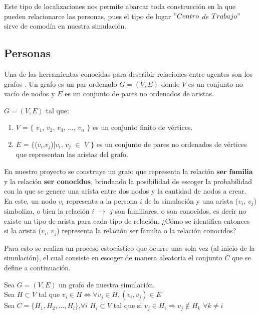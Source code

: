 Este tipo de localizaciones nos permite abarcar toda construcción en la que pueden relacionarce las personas, pues
el tipo de lugar $"Centro$ $de$ $Trabajo"$ sirve de comodín en nuestra simulación.

\subsection{Personas}
Una de las herramientas conocidas para describir relaciones entre agentes son los grafos \autocite{Newman2003}. Un grafo
es un par ordenado $G = (V,E)$ donde $V$ es un conjunto no vacío de nodos y $E$ es un conjunto de pares 
no ordenados de aristas.

\begin{center}
    $G=(V,E)$ tal que:\\
    \begin{enumerate}
        \item $V$ = $\lbrace$ $v_{1}$, $v_{2}$, $v_{3}$, ..., $v_{n}$ $\rbrace$ es un conjunto finito de vértices.
        \item $E$ = $\lbrace$($v_{i}$,$v_{j}$)|$v_{i}$, $v_{j}$ $\in$ $V$ $\rbrace$  es un conjunto de pares no ordenados de vértices que representan las aristas del grafo.
    \end{enumerate}
\end{center}

En nuestro proyecto se construye un grafo que representa la relación $\textbf{ser familia}$ y la relación \textbf{ser conocidos}, brindando
la posibilidad de escoger la probabilidad con la que se genere una arista entre dos nodos y la cantidad de nodos a crear. 
En este, un nodo $v_{i}$ representa a la persona $i$ de la simulación y una arista ($v_{i}$, $v_{j}$) simboliza,
o bien la relación $i$ $\rightarrow$ $j$ son familiares, o son conocidos, es decir no existe un tipo de arista para cada
tipo de relación. ¿Cómo se identifica entonces si la arista ($v_{i}$, $v_{j}$) representa la relación 
ser familia o la relación conocidos?

Para esto se realiza un proceso estocástico que ocurre una sola vez (al inicio de la simulación), el cual consiste 
en escoger de manera aleatoria el conjunto $C$ que se define a continuación.
\begin{center}
    Sea $G = (V,E)$ un grafo de nuestra simulación.\\
    Sea $H \subset V$ tal que $v_{i} \in H \Leftrightarrow \forall v_{j} \in H, (v_{i},v_{j}) \in E$\\
    Sea $C = \lbrace H_{1}, H_{2}, ..., H_{l} \rbrace$,$\forall i$ $H_{i} \subset V$ tal que si $v_{j} \in H_{i} \Rightarrow v_{j} \notin H_{k}$ $\forall k \neq i$\\
\end{center}

